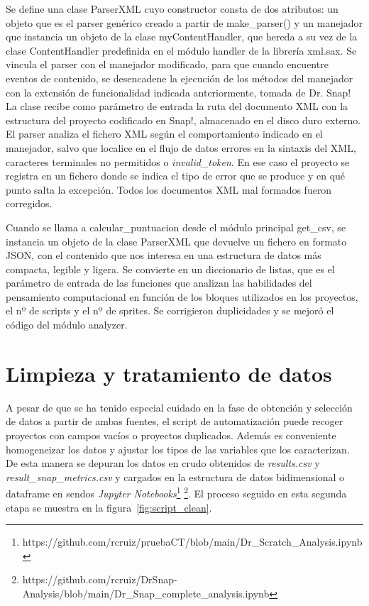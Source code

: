 \documentclass[a4paper, 12pt]{book}
\begin{document}
Se define una clase ParserXML cuyo constructor consta de dos atributos: un objeto que es el parser genérico creado a partir de make\_parser() y un manejador que instancia un objeto de la clase myContentHandler, que hereda a su vez de la clase ContentHandler predefinida en el módulo handler de la librería xml.sax. Se vincula el parser con el manejador modificado, para que cuando encuentre eventos de contenido, se desencadene la ejecución de los métodos del manejador con la extensión de funcionalidad indicada anteriormente, tomada de Dr. Snap! La clase recibe como parámetro de entrada la ruta del documento XML con la estructura del proyecto codificado en Snap!, almacenado en el disco duro externo. El parser analiza el fichero XML según el comportamiento indicado en el manejador, salvo que localice en el flujo de datos errores en la sintaxis del XML, caracteres terminales no permitidos o \emph{invalid\_token}. En ese caso el proyecto se registra en un fichero donde se indica el tipo de error que se produce y en qué punto salta la excepción. Todos los documentos XML mal formados fueron corregidos. 

Cuando se llama a calcular\_puntuacion desde el módulo principal get\_csv, se instancia un objeto de la clase ParserXML que devuelve un fichero en formato JSON, con el contenido que nos interesa en una estructura de datos más compacta, legible y ligera. Se convierte en un diccionario de listas, que es el parámetro de entrada de las funciones que analizan las habilidades del pensamiento computacional en función de los bloques utilizados en los proyectos, el nº de scripts y el nº de sprites. Se corrigieron duplicidades y se mejoró el código del módulo analyzer.

\section{Limpieza y tratamiento de datos} 
\label{sec:clean_data}

A pesar de que se ha tenido especial cuidado en la fase de obtención y selección de datos a partir de ambas fuentes, el script de automatización puede recoger proyectos con campos vacíos o proyectos duplicados. Además es conveniente homogeneizar los datos y ajustar los tipos de las variables que los caracterizan. De esta manera se depuran los datos en crudo obtenidos de \emph{results.csv} y \emph{result\_snap\_metrics.csv} y cargados en la estructura de datos bidimensional o dataframe en sendos \emph{Jupyter Notebooks}\footnote{https://github.com/rcruiz/pruebaCT/blob/main/Dr\_Scratch\_Analysis.ipynb} \footnote{https://github.com/rcruiz/DrSnap-Analysis/blob/main/Dr\_Snap\_complete\_analysis.ipynb}. El proceso seguido en esta segunda etapa se muestra en la figura~\ref{fig:script_clean}. 
\end{document}
